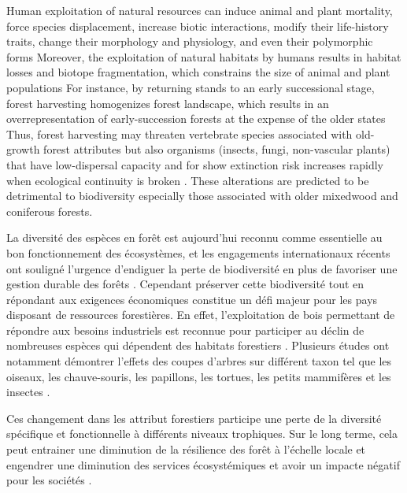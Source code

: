 Human exploitation of natural resources can induce animal and plant mortality, force species displacement, increase biotic interactions, modify their life-history traits, change their morphology and physiology, and even their polymorphic forms \citep{Sergio2018Animalresponses}
Moreover, the exploitation of natural habitats by humans results in habitat losses and biotope fragmentation, which constrains the size of animal and plant populations \citep{Coelho2020Effectsanthropogenic}
For instance, by returning stands to an early successional stage, forest harvesting homogenizes forest landscape, which results in an overrepresentation of early-succession forests at the expense of the older states \citep{Cyr2009Forestmanagement,Boucher2017Cumulativepatterns}
Thus, forest harvesting may threaten vertebrate species associated with old-growth forest attributes but also organisms (insects, fungi, non-vascular plants) that have low-dispersal capacity and for show extinction risk increases rapidly when ecological continuity is broken \citep{Norden2001Conceptualproblems,Martin2021indicatorspecies}.
These alterations are predicted to be detrimental to biodiversity especially those associated with older mixedwood and coniferous forests. \citep{Tremblay2018Harvestinginteracts,Cadieux2020Projectedeffects}



La diversité des espèces en forêt est aujourd'hui reconnu comme essentielle au bon fonctionnement des écosystèmes, et les engagements internationaux récents ont souligné l'urgence d'endiguer la perte de biodiversité en plus de favoriser une gestion durable des forêts \citep{Scherer-Lorenzen2005ForestDiversity,Parviainen2007Maintenanceconservation}. 
Cependant préserver cette biodiversité tout en répondant aux exigences économiques constitue un défi majeur pour les pays disposant de ressources forestières. 
En effet, l'exploitation de bois permettant de répondre aux besoins industriels est reconnue pour participer au déclin de nombreuses espèces qui dépendent des habitats forestiers \citep{Bengtsson2000Biodiversitydisturbances}. 
Plusieurs études ont notamment démontrer l'effets des coupes d'arbres sur différent taxon tel que les oiseaux, les chauve-souris, les papillons, les tortues, les petits mammifères et les insectes \citep{Summerville2011Managingforest,Currylow2012ShortTermForest,Kaminski2013EffectsForest,Kellner2013Shorttermresponses,Caldwell2019ComparisonBat}. 

Ces changement dans les attribut forestiers participe une perte de la diversité spécifique et fonctionnelle à différents niveaux trophiques. 
Sur le long terme, cela peut entrainer une diminution de la résilience des forêt à l'échelle locale et engendrer une diminution des services écosystémiques et avoir un impacte négatif pour les sociétés \citep{Hooper2012globalsynthesis,Edwards2014Maintainingecosystem}. 


